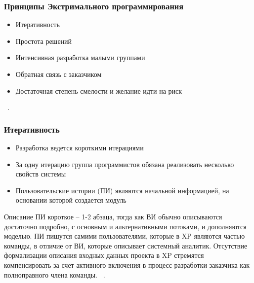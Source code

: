 \documentclass{../industrial-development}
\begin{document}

\begin{frame} \frametitle{Принципы Экстримального программирования}
\begin{itemize}
	\item Итеративность
	\item Простота решений
	\item Интенсивная разработка малыми группами
	\item Обратная связь с заказчиком 
	\item Достаточная степень смелости и желание идти на риск 
	\end{itemize}	
\end{frame}

\lecturenotes

~\cite{Fowler}.


\begin{frame} \frametitle{Итеративность}
\begin{itemize}
\item Разработка ведется короткими итерациями
\item За одну итерацию группа программистов обязана реализовать несколько свойств системы
\item Пользовательские истории (ПИ) являются начальной информацией, на основании которой создается модуль
	\end{itemize}	
\end{frame}

\lecturenotes
Описание ПИ короткое – 1-2 абзаца, тогда как ВИ обычно описываются достаточно подробно, с основным и альтернативными потоками, и дополняются моделью. ПИ пишутся самими пользователями, которые в XP являются частью команды, в отличие от ВИ, которые описывает системный аналитик. Отсутствие формализации описания входных данных проекта в XP стремятся компенсировать за счет активного включения в процесс разработки заказчика как полноправного члена команды. 
~\cite{Fowler}.

\end{document}
